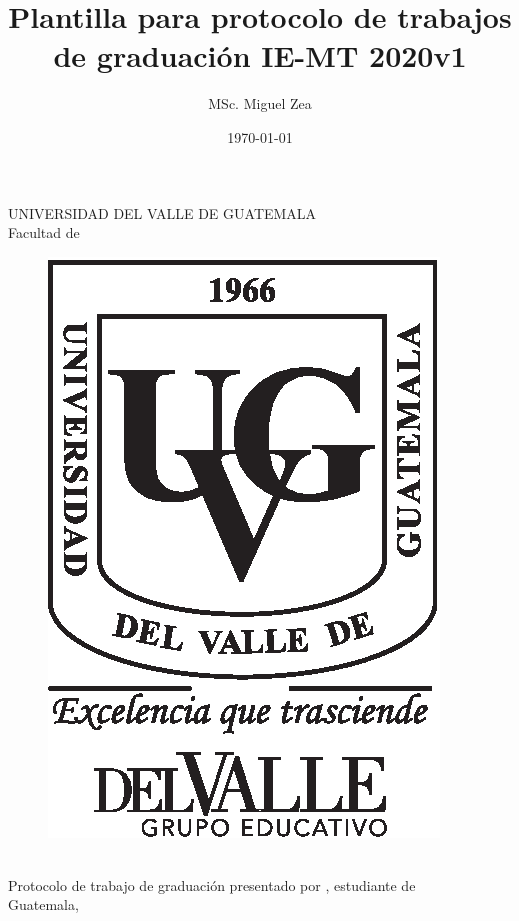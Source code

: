 \documentclass[11pt, letterpaper, twoside, openright]{report}
\title{Plantilla para protocolo de trabajos de graduación IE-MT 2020v1}
\author{MSc. Miguel Zea}
\date{\today}
\begin{document}
\graphicspath{{figuras/}}


\newpage
\cleardoublepage{}
\pagecolor{white}
\color{black}
\setcounter{page}{1}
\thispagestyle{empty}
\begin{center}
	\LARGE UNIVERSIDAD DEL VALLE DE GUATEMALA\\
	\LARGE Facultad de \uvgfacultad \\[0.75cm]
\end{center}
\begin{figure}[h]
	\begin{center}
	\includegraphics[height=5.5 cm]{plantilla/escudoUVGnegro.eps}
	\vspace{0.5in}
	\end{center}
\end{figure}
\begin{center}
	\Large \textbf{\nohyphens{\titulotesis}} \\
	\vfill
	\Large \nohyphens{Protocolo de trabajo de graduación presentado por \nombreestudiante, estudiante de \uvgcarrera} \\
	\vfill
	\large Guatemala, \\
	\vspace{1em}
	\anoentrega
\end{center}

\pagestyle{plain}

\newpage
\cleardoublepage
{}
\setcounter{page}{1}
\end{document}
